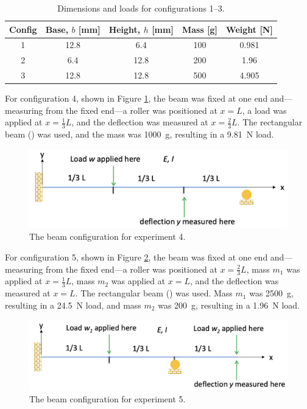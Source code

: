 \documentclass[12 pt]{article}
\begin{document}
\begin{table}[!htbp]
\caption{Dimensions and loads for configurations 1--3.}
\begin{center}
	\begin{tabular}{|c|c|c|c|c|}
		\hline
		Config&Base, $b$ [\unit{\mm}]&Height, $h$ [\unit{\mm}]&Mass [\unit{\g}]&Weight [\unit{\N}]\\
		\hline
		\num{1}&\num{12.8}&\num{6.4}&\num{100}&\num{0.981}\\
		\hline
		\num{2}&\num{6.4}&\num{12.8}&\num{200}&\num{1.96}\\
		\hline
		\num{3}&\num{12.8}&\num{12.8}&\num{500}&\num{4.905}\\
		\hline
	\end{tabular}
\end{center}
\label{tbl:configs}
\end{table}

For configuration 4, shown in Figure \ref{fig:config_4}, the beam was fixed at one end and---measuring from the fixed end---a roller was positioned at $x=L$, a load was applied at $x=\frac{1}{3}L$, and the deflection was measured at $x=\frac{2}{3}L$. The rectangular beam () was used, and the mass was \qty{1000}{\g}, resulting in a \qty{9.81}{\N} load.

\begin{figure}[htbp]
\centering
\includegraphics[width=6in]{images/Config 4}
\caption{The beam configuration for experiment 4.}
\label{fig:config_4}
\end{figure}

For configuration 5, shown in Figure \ref{fig:config_5}, the beam was fixed at one end and---measuring from the fixed end---a roller was positioned at $x=\frac{2}{3}L$, mass $m_1$ was applied at $x=\frac{1}{3}L$, mass $m_2$ was applied at $x=L$, and the deflection was measured at $x=L$. The rectangular beam () was used. Mass $m_1$ was \qty{2500}{\g}, resulting in a \qty{24.5}{\N} load, and mass $m_2$ was \qty{200}{\g}, resulting in a \qty{1.96}{\N} load.

\begin{figure}[htbp]
\centering
\includegraphics[width=6in]{images/Config 5}
\caption{The beam configuration for experiment 5.}
\label{fig:config_5}
\end{figure}
\end{document}
